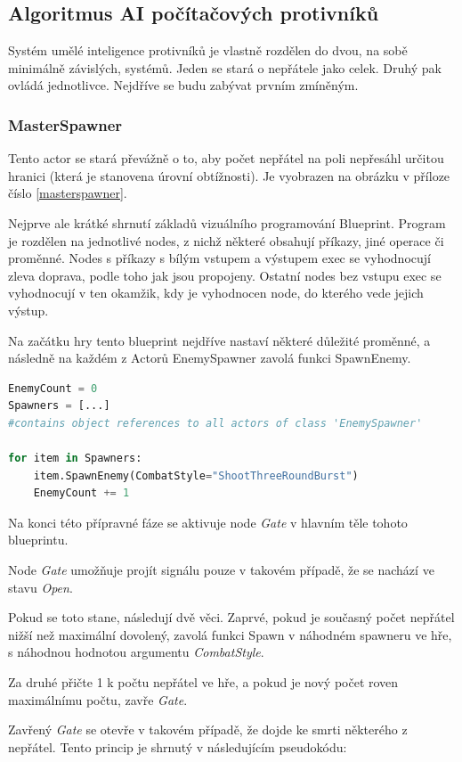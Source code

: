 \documentclass[12pt,a4paper,hidelinks]{article}
\begin{document}
\subsection{Algoritmus AI počítačových protivníků}
Systém umělé inteligence protivníků je vlastně rozdělen do dvou, na sobě minimálně závislých, systémů. Jeden se stará o nepřátele jako celek. Druhý pak ovládá jednotlivce. Nejdříve se budu zabývat prvním zmíněným.


\subsubsection{MasterSpawner}
Tento actor se stará převážně o to, aby počet nepřátel na poli nepřesáhl určitou hranici (která je stanovena úrovní obtížnosti). Je vyobrazen na obrázku v příloze číslo \ref{masterspawner}.

Nejprve ale krátké shrnutí základů vizuálního programování Blueprint. Program je rozdělen na jednotlivé nodes, z nichž některé obsahují příkazy, jiné operace či proměnné. Nodes s příkazy s bílým vstupem a výstupem exec se vyhodnocují zleva doprava, podle toho jak jsou propojeny. Ostatní nodes bez vstupu exec se vyhodnocují v ten okamžik, kdy je vyhodnocen node, do kterého vede jejich výstup.

Na začátku hry tento blueprint nejdříve nastaví některé důležité proměnné, a následně na každém z Actorů EnemySpawner zavolá funkci SpawnEnemy.

\begin{lstlisting}[language=Python]
EnemyCount = 0
Spawners = [...]
#contains object references to all actors of class 'EnemySpawner'

for item in Spawners:
	item.SpawnEnemy(CombatStyle="ShootThreeRoundBurst")
	EnemyCount += 1
\end{lstlisting}
Na konci této přípravné fáze se aktivuje node \textit{Gate}\cite{uedocs:gate} v hlavním těle tohoto blueprintu.

Node \textit{Gate} umožňuje projít signálu pouze v takovém případě, že se nachází ve stavu \textit{Open}.

Pokud se toto stane, následují dvě věci. Zaprvé, pokud je současný počet nepřátel nižší než maximální dovolený, zavolá funkci Spawn v náhodném spawneru ve hře, s náhodnou hodnotou argumentu \textit{CombatStyle}.

Za druhé přičte 1 k počtu nepřátel ve hře, a pokud je nový počet roven maximálnímu počtu, zavře \textit{Gate}.

Zavřený \textit{Gate} se otevře v takovém případě, že dojde ke smrti některého z nepřátel.
Tento princip je shrnutý v následujícím pseudokódu:
\end{document}

